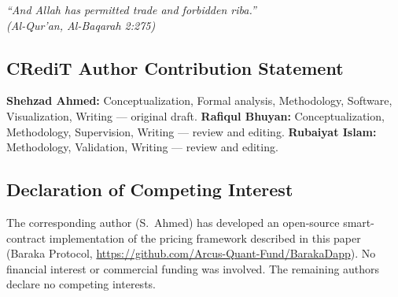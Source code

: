 \documentclass[10pt,twocolumn]{article}
\theoremstyle{plain}
\theoremstyle{definition}
\begin{document}
\bigskip
\noindent\textit{``And Allah has permitted trade and forbidden
\textit{riba}.''}\\
\textit{(Al-Qur'an, Al-Baqarah 2:275)}


\subsection*{CRediT Author Contribution Statement}
\noindent\textbf{Shehzad Ahmed:}
Conceptualization, Formal analysis, Methodology, Software,
Visualization, Writing --- original draft.
\textbf{Rafiqul Bhuyan:}
Conceptualization, Methodology, Supervision,
Writing --- review and editing.
\textbf{Rubaiyat Islam:}
Methodology, Validation, Writing --- review and editing.

\subsection*{Declaration of Competing Interest}
\noindent The corresponding author (S.\ Ahmed) has developed an
open-source smart-contract implementation of the pricing framework
described in this paper (Baraka Protocol,
\url{https://github.com/Arcus-Quant-Fund/BarakaDapp}).
No financial interest or commercial funding was involved.
The remaining authors declare no competing interests.
\end{document}
